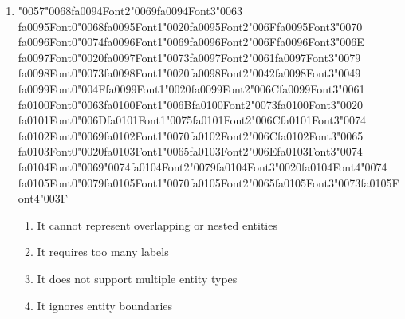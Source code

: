 \documentclass[12pt]{article}
\begin{document}
\begin{enumerate}[label=Q\arabic*.]
\item {\char"0057}{\char"0068}{\csname fa0094Font2\endcsname\char"0069}{\csname fa0094Font3\endcsname\char"0063} {\csname fa0095Font0\endcsname\char"0068}{\csname fa0095Font1\endcsname\char"0020}{\csname fa0095Font2\endcsname\char"006F}{\csname fa0095Font3\endcsname\char"0070} {\csname fa0096Font0\endcsname\char"0074}{\csname fa0096Font1\endcsname\char"0069}{\csname fa0096Font2\endcsname\char"006F}{\csname fa0096Font3\endcsname\char"006E} {\csname fa0097Font0\endcsname\char"0020}{\csname fa0097Font1\endcsname\char"0073}{\csname fa0097Font2\endcsname\char"0061}{\csname fa0097Font3\endcsname\char"0079} {\csname fa0098Font0\endcsname\char"0073}{\csname fa0098Font1\endcsname\char"0020}{\csname fa0098Font2\endcsname\char"0042}{\csname fa0098Font3\endcsname\char"0049} {\csname fa0099Font0\endcsname\char"004F}{\csname fa0099Font1\endcsname\char"0020}{\csname fa0099Font2\endcsname\char"006C}{\csname fa0099Font3\endcsname\char"0061} {\csname fa0100Font0\endcsname\char"0063}{\csname fa0100Font1\endcsname\char"006B}{\csname fa0100Font2\endcsname\char"0073}{\csname fa0100Font3\endcsname\char"0020} {\csname fa0101Font0\endcsname\char"006D}{\csname fa0101Font1\endcsname\char"0075}{\csname fa0101Font2\endcsname\char"006C}{\csname fa0101Font3\endcsname\char"0074} {\csname fa0102Font0\endcsname\char"0069}{\csname fa0102Font1\endcsname\char"0070}{\csname fa0102Font2\endcsname\char"006C}{\csname fa0102Font3\endcsname\char"0065} {\csname fa0103Font0\endcsname\char"0020}{\csname fa0103Font1\endcsname\char"0065}{\csname fa0103Font2\endcsname\char"006E}{\csname fa0103Font3\endcsname\char"0074} {\csname fa0104Font0\endcsname\char"0069}{\char"0074}{\csname fa0104Font2\endcsname\char"0079}{\csname fa0104Font3\endcsname\char"0020}{\csname fa0104Font4\endcsname\char"0074} {\csname fa0105Font0\endcsname\char"0079}{\csname fa0105Font1\endcsname\char"0070}{\csname fa0105Font2\endcsname\char"0065}{\csname fa0105Font3\endcsname\char"0073}{\csname fa0105Font4\endcsname\char"003F}
\begin{enumerate}[label=(\Alph*)]
    \item It cannot represent overlapping or nested entities
    \item It requires too many labels
    \item It does not support multiple entity types
    \item It ignores entity boundaries
\end{enumerate}

\end{enumerate}
\end{document}
